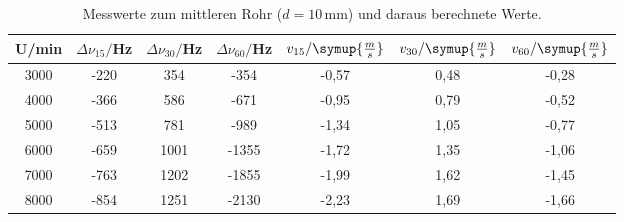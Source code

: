 \begin{table}[htp]
	\begin{center}
    \caption{Messwerte zum mittleren Rohr ($d=10\,$mm) und daraus berechnete Werte.}
    \label{tab:mittel}
		\begin{tabular}{ccccccc}
		\toprule
			{U/min} & {$\Delta \nu_{15}/$Hz} & {$\Delta \nu_{30}/$Hz} & {$\Delta \nu_{60}/$Hz} &
      {$v_{15}/\symup{\frac{m}{s}}$} & {$v_{30}/\symup{\frac{m}{s}}$} & {$v_{60}/\symup{\frac{m}{s}}$}\\
			\midrule
			3000 & -220 & 354 & -354 & -0,57 & 0,48 & -0,28\\
			4000 & -366 & 586 & -671 & -0,95 & 0,79 & -0,52\\
			5000 & -513 & 781 & -989 & -1,34 & 1,05 & -0,77\\
			6000 & -659 & 1001 & -1355 & -1,72 & 1,35 & -1,06\\
			7000 & -763 & 1202 & -1855 & -1,99 & 1,62 & -1,45\\
			8000 & -854 & 1251 & -2130 & -2,23 & 1,69 & -1,66\\
		\bottomrule
		\end{tabular}
	\end{center}
\end{table}

